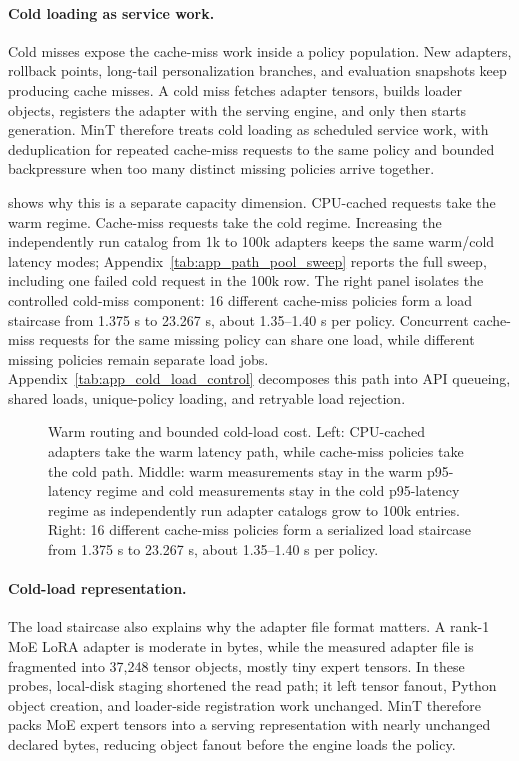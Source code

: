 \paragraph{Cold loading as service work.}
Cold misses expose the cache-miss work inside a policy population. New adapters, rollback points, long-tail personalization branches, and evaluation snapshots keep producing cache misses. A cold miss fetches adapter tensors, builds loader objects, registers the adapter with the serving engine, and only then starts generation. MinT therefore treats cold loading as scheduled service work, with deduplication for repeated cache-miss requests to the same policy and bounded backpressure when too many distinct missing policies arrive together.

 shows why this is a separate capacity dimension. CPU-cached requests take the warm regime. Cache-miss requests take the cold regime. Increasing the independently run catalog from 1k to 100k adapters keeps the same warm/cold latency modes; Appendix~\cref{tab:app_path_pool_sweep} reports the full sweep, including one failed cold request in the 100k row. The right panel isolates the controlled cold-miss component: 16 different cache-miss policies form a load staircase from 1.375 s to 23.267 s, about 1.35--1.40 s per policy. Concurrent cache-miss requests for the same missing policy can share one load, while different missing policies remain separate load jobs. Appendix~\cref{tab:app_cold_load_control} decomposes this path into API queueing, shared loads, unique-policy loading, and retryable load rejection.

\begin{figure}[H]
    \centering
    \resizebox{0.92\textwidth}{!}{}
    \vspace{-10PT}
    \caption{Warm routing and bounded cold-load cost. Left: CPU-cached adapters take the warm latency path, while cache-miss policies take the cold path. Middle: warm measurements stay in the warm p95-latency regime and cold measurements stay in the cold p95-latency regime as independently run adapter catalogs grow to 100k entries. Right: 16 different cache-miss policies form a serialized load staircase from 1.375 s to 23.267 s, about 1.35--1.40 s per policy.}
    \vspace{-10PT}
    \label{fig:e4_latency_catalog}
\end{figure}

\paragraph{Cold-load representation.}
The load staircase also explains why the adapter file format matters. A rank-1 MoE LoRA adapter is moderate in bytes, while the measured adapter file is fragmented into 37{,}248 tensor objects, mostly tiny expert tensors. In these probes, local-disk staging shortened the read path; it left tensor fanout, Python object creation, and loader-side registration work unchanged. MinT therefore packs MoE expert tensors into a serving representation with nearly unchanged declared bytes, reducing object fanout before the engine loads the policy.

